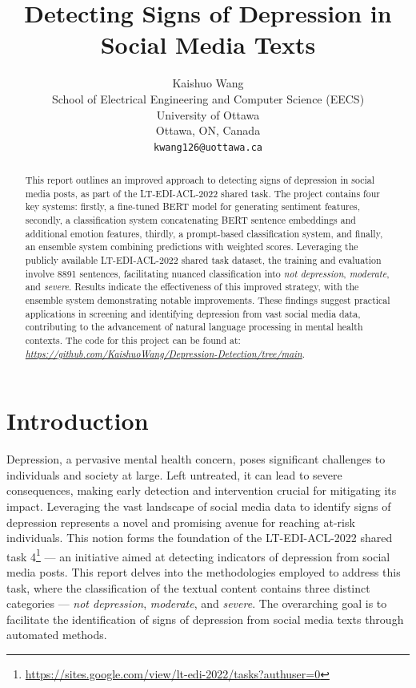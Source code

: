 \documentclass{article}
\title{Detecting Signs of Depression in Social Media Texts}
\author{%
  Kaishuo Wang\\
  School of Electrical Engineering and Computer Science (EECS)\\
  University of Ottawa\\
  Ottawa, ON, Canada \\
  \texttt{kwang126@uottawa.ca} \\
}
\begin{document}
\maketitle

\begin{abstract}
  This report outlines an improved approach to detecting signs of depression in social media posts, as part of the LT-EDI-ACL-2022 shared task. The project contains four key systems: firstly, a fine-tuned BERT model for generating sentiment features, secondly, a classification system concatenating BERT sentence embeddings and additional emotion features, thirdly, a prompt-based classification system, and finally, an ensemble system combining predictions with weighted scores. Leveraging the publicly available LT-EDI-ACL-2022 shared task dataset, the training and evaluation involve 8891 sentences, facilitating nuanced classification into \emph{not depression}, \emph{moderate}, and \emph{severe}. Results indicate the effectiveness of this improved strategy, with the ensemble system demonstrating notable improvements. These findings suggest practical applications in screening and identifying depression from vast social media data, contributing to the advancement of natural language processing in mental health contexts. The code for this project can be found at: \emph{\url{https://github.com/KaishuoWang/Depression-Detection/tree/main}}.
\end{abstract}

\section{Introduction}

Depression, a pervasive mental health concern, poses significant challenges to individuals and society at large. Left untreated, it can lead to severe consequences, making early detection and intervention crucial for mitigating its impact. Leveraging the vast landscape of social media data to identify signs of depression represents a novel and promising avenue for reaching at-risk individuals. This notion forms the foundation of the LT-EDI-ACL-2022 shared task 4\footnote{\url{https://sites.google.com/view/lt-edi-2022/tasks?authuser=0}} — an initiative aimed at detecting indicators of depression from social media posts. This report delves into the methodologies employed to address this task, where the classification of the textual content contains three distinct categories — \emph{not depression}, \emph{moderate}, and \emph{severe}. The overarching goal is to facilitate the identification of signs of depression from social media texts through automated methods.
\end{document}
